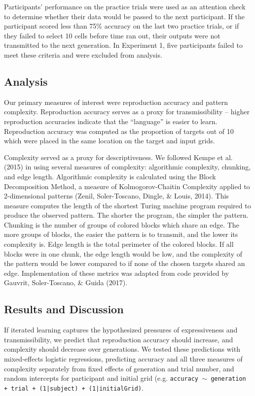 \documentclass[10pt, letterpaper]{article}
\begin{document}
Participants' performance on the practice trials were used as an
attention check to determine whether their data would be passed to the
next participant. If the participant scored less than 75\% accuracy on
the last two practice trials, or if they failed to select 10 cells
before time ran out, their outputs were not transmitted to the next
generation. In Experiment 1, five participants failed to meet these
criteria and were excluded from analysis.

\subsection{Analysis}\label{analysis}

Our primary measures of interest were reproduction accuracy and pattern
complexity. Reproduction accuracy serves as a proxy for transmissibility
-- higher reproduction accuracies indicate that the ``language'' is
easier to learn. Reproduction accuracy was computed as the proportion of
targets out of 10 which were placed in the same location on the target
and input grids.

Complexity served as a proxy for descriptiveness. We followed Kempe et
al. (2015) in using several measures of complexity: algorithmic
complexity, chunking, and edge length. Algorithmic complexity is
calculated using the Block Decomposition Method, a measure of
Kolmogorov-Chaitin Complexity applied to 2-dimensional patterns (Zenil,
Soler-Toscano, Dingle, \& Louis, 2014). This measure computes the length
of the shortest Turing machine program required to produce the observed
pattern. The shorter the program, the simpler the pattern. Chunking is
the number of groups of colored blocks which share an edge. The more
groups of blocks, the easier the pattern is to transmit, and the lower
its complexity is. Edge length is the total perimeter of the colored
blocks. If all blocks were in one chunk, the edge length would be low,
and the complexity of the pattern would be lower compared to if none of
the chosen targets shared an edge. Implementation of these metrics was
adapted from code provided by Gauvrit, Soler-Toscano, \& Guida (2017).

\subsection{Results and Discussion}\label{results-and-discussion}

If iterated learning captures the hypothesized pressures of
expressiveness and transmissibility, we predict that reproduction
accuracy should increase, and complexity should decrease over
generations. We tested these predictions with mixed-effects logistic
regressions, predicting accuracy and all three measures of complexity
separately from fixed effects of generation and trial number, and random
intercepts for participant and initial grid (e.g.
\texttt{accuracy $\sim$ generation + trial +  (1|subject) + (1|initialGrid)}.
\end{document}
